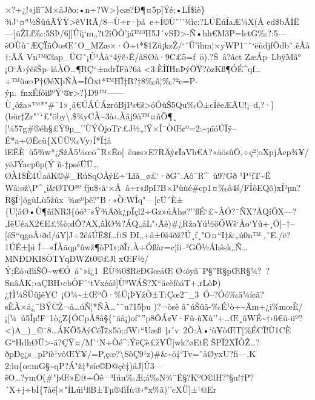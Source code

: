 ×?+¿!«jlî¯M×âJðo;•n÷?W\textgreater\}eæ?Ð¶¤5p{]}Ýé;•LÍ\$ìè\}¾J`¤ª½ŠûúÃŸŸ\textgreater êVRÃ/8¬Ù÷r·þá~e÷Í©Ù¨''¾ìc:?L ÚËúÍaÆ¼­X(Å
ed\$bÂÏË---{]}üŽLƒ‰:5SÞ/6{]}{]}Ûí¡`m„?t2îÖÒ'já™³H5J´vSÐ\textgreater-Ñ•hh€M3P=lctG‰?:5---šOÙù¨ÆÇÏñÔœŒˆO\_MZæ\textbar×·Ô÷t*\$1Zü¡kzŽ/`´Û­'îhm¦×yWP1¨˜`ëùdj\textbar fÔdb˜.êÃà†;ÄÄ
Vn™\textbar©ïap\textquotesingle\_ÜG˜¡­Û³Åà``4ÿê›Ê/åSØà·9C£5=f~ö).?Š~â?åct
ZæÁp--LbÿMâ° ¡O`Ã›ýëšŠp--îáÀÖ\ldots¶RÇ``±adrÏFà?6ã
\textless3:ÈÎÏHnÞýÖŸ?òzKß¶ÓÉ\^{}qƒ\ldots÷™üæ›\textquotesingle P†ØéXþÑÀ=ÎÕxt*™HÏ‡B?‡8‰ñ¦‰?²e=P-ýµ.~fnxÉfôißº Ý`®r\textgreater?\}D9™------Ù¸ôža»™*"\#¯1»¸â€ÚÁÛÁzróBjPs€š\textgreater óÕùŠ5Qu\textbar‰Õ±cÍéeÆÄU!¡--d,?·{]}(b\textbar ür‡Zr"``£"öby\textbackslash.\$¾yCÀ\textasciitilde3à‹.Àâj9à™¤ñÖ¶¸
{[}¼57g\#®éh§£Ý9µ\_''ÙÝÒjoTï`£J½„!Ÿ×Î¨ÒŒ¢º=2:\textasciitilde µîóÚÏÿ--É*a÷ØÊcù\{XÛÜ‰Vy›Í*Ï‡å
ìEËÈ¯ù5¾w*¿SžÃ5¼œö\^{}R«Êo{[}~šu¢s»E7RÄý¢ÏaVh€A\textbar?«äö\textquotesingle sûÖ‚÷ç²¦oXpjÂep¾¥/yëJÝacp6p(Ý
ñ-‡pséÜÜ\ldots ØÀ1\$È4ÚaåK©\#\_RúSqOÅýE÷'Lïã\_ø£`·ðGˆ.Aô¯ R\^{}~ù9?Gð
¹P¹íT\textasciitilde Ë Wâ:øž\textbackslash P\^{}¸î\&ØTO³º
fju\$‹ã`×Å~â÷r«ßp I?B×Pùùé\#cp1¤\textbar‰à4š/FÎôEQô)xÍ²µn?R§Í`{]}õgùLù5žûx¯¾æºþê?"B·«Ò:WÎq"---{[}cÜ´È±\{U¦âØ•Ù¶ñîNR3\{óó³¯sŸ¾Äðk¿pÏçl2÷Gz»úÂhø?''ßÉ\textquotesingle`£\textasciitilde ÀÓ?¯ÑX?ÅQíÖX---?‚IëUéaX2€E£\%ò;dÔ?AX‚âÌØ¾?ÁQ„åL"›Äé)\#¿RžaYú½öÖWš`Åo`Yû+¸Ó{]}--†--{[}éS``qgoÅ›ðd/áY{]}J÷2éáÚË\$f\ldotsƒ›S
ÐI„+å±0š4ðž?Ú¸f¸\textbar"O¤``I‡\&„ú0n™ ‚˜E./ë?1ÚÉ±þì
Í---«ÍÀãqµ­°ûwž¶òPI»;ðÎr.À÷Óßàr= c¦îi--³GÖ½Áhšsk„Ñ\ldots MNÐDKI8ÒTYqDWZt0©£Jl
xŒF½/Ý;Êó›dìiŠÔ\textasciitilde w€Ó~å¨»ï¿1~ËÙ¾0\$RëÐ GœáŒ
Ø‹óyä¯P§\textbar ''R§\textbar pŒR§¼?~?SnâÅK;›aÇB H›cbÒFˆ`tVxéáš{]}ÙºWÁŠ?X`` äcèfòáT+‚rLòÞ)¿†Ì ¼ŠÜüjëYC~¡O¼\textasciitilde±ŒºÕ·\%Ú¡Þ¥ž­Ò±T:Çœ2 ¯\_3~Ó--?Óó‰ä¼í¢\textbar ã?sÈÀ×å¿¯BÝCŽ¬å\ldots úÑ¦*ÑÀ\ldots ˆ¯u?15þu
)\textquotesingle?¬òsê
â¨ ú Šûã-‰É¹ò÷\textasciitilde Äm+¿i\%mœÈ/¡{[}¼~ú5Îµ!F¯1ò¿Z\{ÓCpÃ8å§\{¨ãå¡)of˜''p8ÕÁ¢V·Fû-ùXù''+\ldots Œ¸ûWÉ\textasciitilde†›6€û-üº?\textless{})A\_)\_©¨8\ldots ÁKÖ5ÄýCêÏ7x5ô;;ƒW›``Uæß~þ´v~2Ò:À•`ù¥òŒT{[}\%ÉCÏ!Ù1CÈ
G``HdhØÜ\textgreater-ä?ÇŸ¤/M'\,`N÷Òé\^{}:ÝëÇè£ž¥Û{]}wk?øEtË
ŠPÏ2XÏÒŽ\ldots ?ðpÐç\textquotesingle¿s\_pPíè¹vôŒŸ¥/=P,çœ?\textbackslash SòÇ9¹z)\#\&\textasciitilde ö‡`T\textquotesingle v= ˆåØyxU?ƒi---‚K
2;ìu\{œ:mG§\textasciitildeqP?Á"ž‡­*síc©Ð@çè‡)åJ{]}Û3---šO\ldots ?ymO(\#"þŒ\textbar*»Ë@÷Ôê·\textbar³Iúu‰Æ;á‰N¾¯Ë§?KºO©lH?"§u!†P?´X+j÷bÍ\{7àë{[}×"ÍLúi¹ßB±Tµ®4ìÏù@›*x\%ã)''cX\textquotesingle Ü{]}±¹@Er
